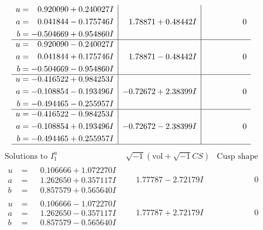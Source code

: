 \documentclass[1p]{elsarticle_modified}
\theoremstyle{definition}
\newcommand{\I}{\sqrt{-1}}
\begin{document}
$$\begin{array}{c|c|c}
\begin{aligned}
u &= \phantom{-}0.920090 + 0.240027 I \\
a &= \phantom{-}0.041844 - 0.175746 I \\
b &= -0.504669 + 0.954860 I\end{aligned}
 & \phantom{-}1.78871 + 0.48442 I & \phantom{-0.000000 } 0 \\ \hline\begin{aligned}
u &= \phantom{-}0.920090 - 0.240027 I \\
a &= \phantom{-}0.041844 + 0.175746 I \\
b &= -0.504669 - 0.954860 I\end{aligned}
 & \phantom{-}1.78871 - 0.48442 I & \phantom{-0.000000 } 0 \\ \hline\begin{aligned}
u &= -0.416522 + 0.984253 I \\
a &= -0.108854 - 0.193496 I \\
b &= -0.494465 - 0.255957 I\end{aligned}
 & -0.72672 + 2.38399 I & \phantom{-0.000000 } 0 \\ \hline\begin{aligned}
u &= -0.416522 - 0.984253 I \\
a &= -0.108854 + 0.193496 I \\
b &= -0.494465 + 0.255957 I\end{aligned}
 & -0.72672 - 2.38399 I & \phantom{-0.000000 } 0\\
 \hline 
 \end{array}$$\newpage$$\begin{array}{c|c|c}  
\text{Solutions to }I^u_{1}& \I (\text{vol} + \sqrt{-1}CS) & \text{Cusp shape}\\
 \hline 
\begin{aligned}
u &= \phantom{-}0.106666 + 1.072270 I \\
a &= \phantom{-}1.262650 + 0.357117 I \\
b &= \phantom{-}0.857579 + 0.565640 I\end{aligned}
 & \phantom{-}1.77787 - 2.72179 I & \phantom{-0.000000 } 0 \\ \hline\begin{aligned}
u &= \phantom{-}0.106666 - 1.072270 I \\
a &= \phantom{-}1.262650 - 0.357117 I \\
b &= \phantom{-}0.857579 - 0.565640 I\end{aligned}
 & \phantom{-}1.77787 + 2.72179 I & \phantom{-0.000000 } 0 \\ \hline\begin{aligned}

\end{aligned}
\end{array}$$
\end{document}
